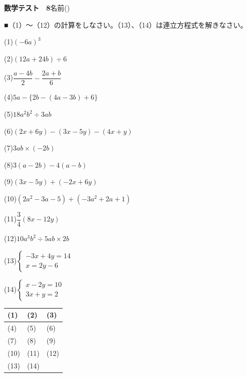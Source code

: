 \documentclass[a4paper,11pt]{ltjsarticle}
\newlength{\qcol}\setlength{\qcol}{0.47\textwidth}
\newlength{\qgap}
\newlength{\anscolw}\setlength{\anscolw}{0.30\textwidth}
\newlength{\ansh}
\newcommand{\Q}[2]{\parbox[t]{\qcol}{\raggedright (#1)\hspace{0.6em}$\displaystyle #2$}}
\newcommand{\QR}[4]{\Q{#1}{#2}\hfill\Q{#3}{#4}\par\vspace{\qgap}}
\newcommand{\anscell}[1]{\rule[-\ansdrop]{0pt}{\ansh}(#1)}
\newlength{\ansdrop}
\begin{document}
{\large\bfseries 数学テスト　8}\hfill 名前(\underline{\hspace{32mm}})\par\vspace{3mm}
■（1）〜（12）の計算をしなさい。（13）、（14）は連立方程式を解きなさい。\par\vspace{3mm}
\setlength{\qgap}{11mm}
\QR{1}{(-6a)^3}{2}{(12a+24b)\div6}
\QR{3}{\dfrac{a-4b}{2}-\dfrac{2a+b}{6}}{4}{5a-\{2b-(4a-3b)+6\}}
\QR{5}{18a^2b^2\div3ab}{6}{(2x+6y)-(3x-5y)-(4x+y)}
\QR{7}{3ab\times(-2b)}{8}{3(a-2b)-4(a-b)}
\QR{9}{(3x-5y)+(-2x+6y)}{10}{(2a^2-3a-5)+(-3a^2+2a+1)}
\QR{11}{\dfrac{3}{4}(8x-12y)}{12}{10a^3b^2\div5ab\times2b}
\QR{13}{\left\{\begin{array}{l} -3x+4y=14 \\ x=2y-6 \end{array}\right.}{14}{\left\{\begin{array}{l} x-2y=10 \\ 3x+y=2 \end{array}\right.}
\vfill
\setlength{\ansh}{12mm}\setlength{\ansdrop}{8mm}%
\begin{center}\begin{tabular}{|p{\anscolw}|p{\anscolw}|p{\anscolw}|}\hline
\anscell{1} & \anscell{2} & \anscell{3} \\\hline
\anscell{4} & \anscell{5} & \anscell{6} \\\hline
\anscell{7} & \anscell{8} & \anscell{9} \\\hline
\anscell{10} & \anscell{11} & \anscell{12} \\\hline
\anscell{13} & \anscell{14} &  \\\hline
\end{tabular}\end{center}
\end{document}
